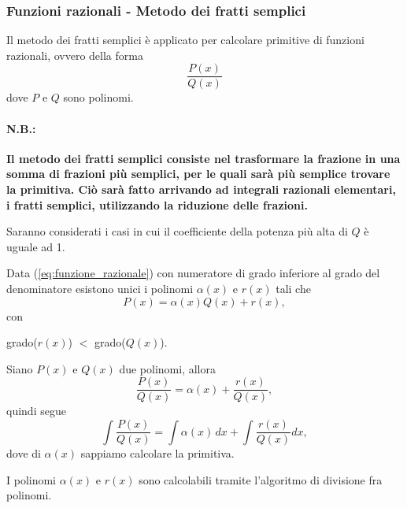 \subsubsection{Funzioni razionali - Metodo dei fratti semplici}
Il metodo dei fratti semplici è applicato per calcolare primitive di funzioni razionali, ovvero della forma
\begin{equation}\label{eq:funzione_razionale}
    \frac{P(x)}{Q(x)}
\end{equation}
dove $P$ e $Q$ sono \gls{polinomi}. 

\paragraph{N.B.:} \textbf{Il metodo dei fratti semplici consiste nel trasformare la frazione in una somma di frazioni più semplici, per le quali sarà più semplice trovare la primitiva. Ciò sarà fatto arrivando ad integrali razionali elementari, i fratti semplici, utilizzando la riduzione delle frazioni.}

\noindent Saranno considerati i casi in cui il coefficiente della potenza più alta di $Q$ è uguale ad 1.

\begin{proposition}
    Data (\ref{eq:funzione_razionale}) con numeratore di grado inferiore al grado del denominatore esistono unici i polinomi $\alpha(x)$ e $r(x)$ tali che
    \begin{equation*}
        P(x) =  \alpha(x) Q(x) + r(x),
    \end{equation*}
    con
    \begin{center}
        grado($r(x)$) $<$ grado($Q(x)$).
    \end{center}
\end{proposition}

\begin{remark}
    Siano $P(x)$ e $Q(x)$ due \gls{polinomi}, allora
    \begin{equation*}
        \frac{P(x)}{Q(x)}=\alpha(x)+\frac{r(x)}{Q(x)},
    \end{equation*}
    quindi segue
    \begin{equation*}
        \int \frac{P(x)}{Q(x)} = \int\alpha(x)\, dx + \int\frac{r(x)}{Q(x)} dx,
    \end{equation*}
    dove di $\alpha(x)$ sappiamo calcolare la primitiva.
\end{remark}

I polinomi $\alpha(x)$ e $r(x)$ sono calcolabili tramite l'algoritmo di divisione fra polinomi.

